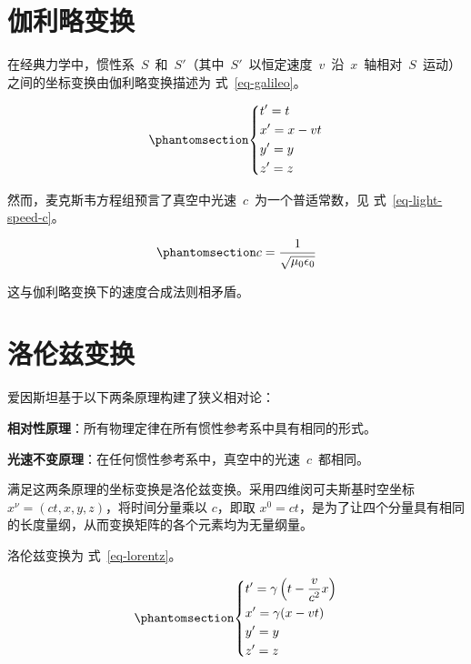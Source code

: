 \documentclass[
  chinese,
  a4paper,
  UTF8,
  12pt,
  oneside,
  openany]{ctexbook}
\theoremstyle{plain}
\theoremstyle{plain}
\theoremstyle{plain}
\theoremstyle{definition}
\theoremstyle{plain}
\theoremstyle{plain}
\theoremstyle{remark}
\begin{document}
\section{伽利略变换}\label{ux4f3dux5229ux7565ux53d8ux6362-1}

在经典力学中，惯性系~\(S\)~和~\(S'\)（其中~\(S'\)~以恒定速度~\(v\)~沿~\(x\)~轴相对~\(S\)~运动）之间的坐标变换由伽利略变换描述为
式~\ref{eq-galileo}。

\begin{equation}\protect\phantomsection\label{eq-galileo}{
\left\{\begin{aligned}
  & t' = t \\
  & x' = x - vt \\
  & y' = y \\
  & z' = z
 \end{aligned} \right.
}\end{equation}

然而，麦克斯韦方程组预言了真空中光速~\(c\)~为一个普适常数，见
式~\ref{eq-light-speed-c}。

\begin{equation}\protect\phantomsection\label{eq-light-speed-c}{
c = \frac{1}{\sqrt{\mu_{0}\epsilon_{0}}}
}\end{equation}

这与伽利略变换下的速度合成法则相矛盾。

\section{洛伦兹变换}\label{ux6d1bux4f26ux5179ux53d8ux6362-1}

爱因斯坦基于以下两条原理构建了狭义相对论：

\textbf{相对性原理}：所有物理定律在所有惯性参考系中具有相同的形式。

\textbf{光速不变原理}：在任何惯性参考系中，真空中的光速~\(c\)~都相同。

满足这两条原理的坐标变换是洛伦兹变换。采用四维闵可夫斯基时空坐标~\(x^{\nu}=(ct,x,y,z)\)，将时间分量乘以
\(c\)，即取
\(x^{0} = ct\)，是为了让四个分量具有相同的长度量纲，从而变换矩阵的各个元素均为无量纲量。

洛伦兹变换为 式~\ref{eq-lorentz}。

\begin{equation}\protect\phantomsection\label{eq-lorentz}{
\left\{\begin{aligned}
  & t' = \gamma\left(t - \frac{v}{c^{2}}x \right) \\
  & x' = \gamma(x - vt) \\
  & y' = y \\
  & z' = z
 \end{aligned} \right.
}\end{equation}
\end{document}
